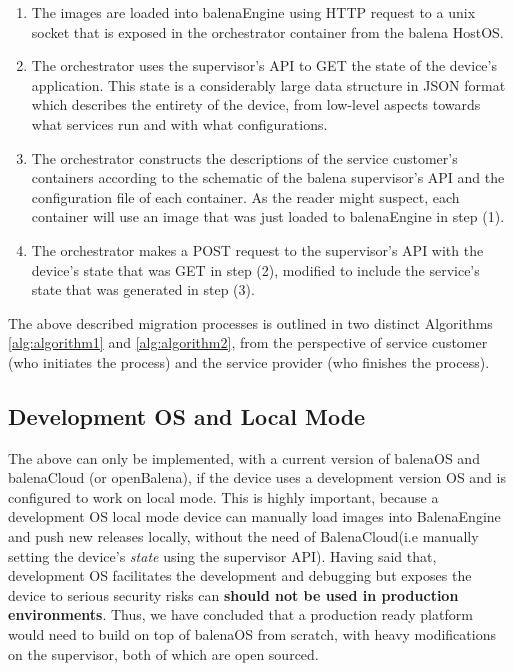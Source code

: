 \begin{enumerate}
    \item The images are loaded into balenaEngine using HTTP request to a unix socket that is exposed in the orchestrator container from the balena HostOS. 
    \item The orchestrator uses the supervisor’s API to GET the state of the device’s application. This state is a considerably large data structure in JSON format which describes the entirety of the device, from low-level aspects towards what services run and with what  
    configurations. 
    \item The orchestrator constructs the descriptions of the service customer’s containers according to the schematic of the balena supervisor’s API and the configuration file of each container. As the reader might suspect, each container will use an image that was just loaded to balenaEngine in step (1).
    \item The orchestrator makes a POST request to the supervisor’s API with the device’s state that was GET in step (2), modified to include the service’s state that was generated in step (3).
\end{enumerate}

The above described migration processes is outlined in two distinct Algorithms \ref{alg:algorithm1} and \ref{alg:algorithm2}, from the perspective of service customer (who initiates the process) and the service provider (who finishes the process).

\subsection{Development OS and Local Mode}
The above can only be implemented, with a current version of balenaOS and balenaCloud (or openBalena), if the device uses a development version OS and is configured to work on local mode\cite{localmode}. This is highly important, because a development OS local mode device can manually load images into BalenaEngine and push new releases locally, without the need of BalenaCloud(i.e manually setting the device's \textit{state} using the supervisor API). Having said that, development OS facilitates the development and debugging but exposes the device to serious security risks can \textbf{should not be used in production environments}. Thus, we have concluded that a production ready platform would need to build on top of balenaOS from scratch, with heavy modifications on the supervisor, both of which are open sourced.


